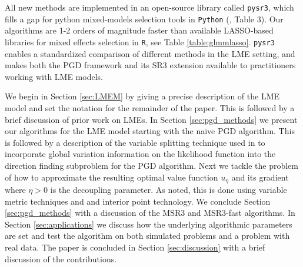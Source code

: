 All new methods are implemented in an open-source library called \texttt{pysr3}, which fills a gap for python mixed-models selection tools in \texttt{Python} (\cite{Buscemi2019Survey}, Table 3). Our algorithms are  1-2 orders of magnitude faster than available LASSO-based libraries for  mixed effects selection in \texttt{R},  see Table \ref{table:glmmlasso}. \texttt{pysr3} enables a standardized comparison of different methods in the LME setting, and makes both the PGD framework and its SR3 extension available to practitioners working with LME models. 

We begin in Section \ref{sec:LMEM} by giving a precise description of the LME
model and set the notation for the remainder of the paper. 
This is followed by a brief discussion of prior work on LMEs.
In Section \ref{sec:pgd_methods} we present our algorithms for the LME model 
starting with the naive PGD algorithm. This is followed by a description of the 
variable splitting technique used in \cite{Zheng2019SR3} to incorporate global 
variation information on the likelihood function into the direction finding subproblem
for the PGD algorithm. 
Next we tackle the problem of how to approximate the 
resulting optimal value function $u_\eta$ and its gradient where $\eta>0$ is the 
decoupling parameter. As noted, this is done using variable metric techniques and 
and interior point technology. We conclude Section \ref{sec:pgd_methods} 
with a discussion of the
MSR3 and MSR3-fast algorithms. In Section \ref{sec:applications} we discuss how
the underlying algorithmic parameters are set and test the algorithm on both 
simulated problems and a problem with real data. The paper is concluded in
Section \ref{sec:discussion} with a brief discussion of the contributions.



